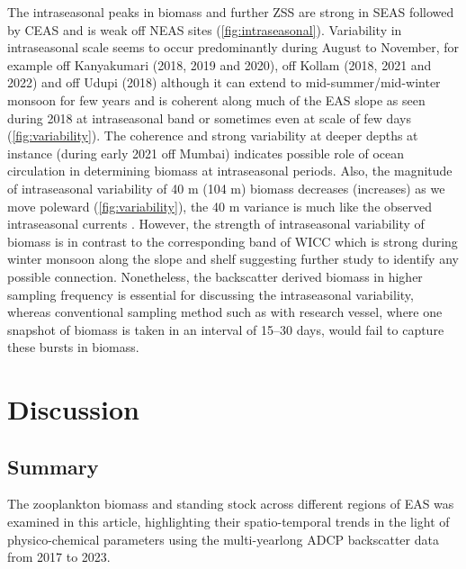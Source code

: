 \documentclass{article}
\begin{document}
	The intraseasonal peaks in biomass and further ZSS are strong in SEAS followed by CEAS and is weak off NEAS sites (\cref{fig:intraseasonal}). Variability in intraseasonal scale seems to occur predominantly during August to November, for example off Kanyakumari (2018, 2019 and 2020), off Kollam (2018, 2021 and 2022) and off Udupi (2018) although it can extend to mid-summer/mid-winter monsoon for few years and is coherent along much of the EAS slope as seen during 2018 at intraseasonal band or sometimes even at scale of few days (\cref{fig:variability}). The coherence and strong variability at deeper depths at instance (during early 2021 off Mumbai) indicates possible role of ocean circulation in determining biomass at intraseasonal periods. Also, the magnitude of intraseasonal variability of 40 m (104 m) biomass decreases (increases) as we move poleward (\cref{fig:variability}), the 40 m variance is much like the observed intraseasonal currents \citep{amol2014observed, chaudhuri2020observed,chaudhuri2021observed}. However, the strength of intraseasonal variability of biomass is in contrast to the corresponding band of WICC which is strong during winter monsoon along the slope \citep{amol2014observed, chaudhuri2020observed} and shelf \citep{chaudhuri2021observed} suggesting further study to identify any possible connection. Nonetheless, the backscatter derived biomass in higher sampling frequency is essential for discussing the intraseasonal variability, whereas conventional sampling method such as with research vessel, where one snapshot of biomass is taken in an interval of 15--30 days, would fail to capture these bursts in biomass.
	   

	\section{Discussion}
	
	\subsection{Summary}
	The zooplankton biomass and standing stock across different regions of EAS was examined in this article, highlighting their spatio-temporal trends in the light of physico-chemical parameters using the multi-yearlong ADCP backscatter data from 2017 to 2023. 
	
\end{document}
